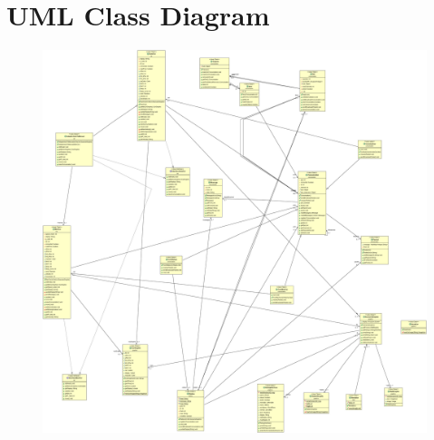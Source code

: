 \documentclass[a4paper,titlepage]{article}
\begin{document}
\newpage
\part{UML Class Diagram}


\begin{figure}
\centering
\includegraphics[scale=0.2]{classDiagram.png}
\end{figure}
\end{document}
